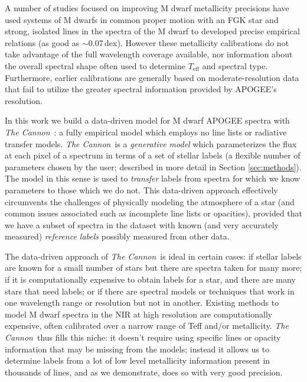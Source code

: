 \documentclass[twocolumn]{aastex62}
\newcommand{\thecannon}{\textsl{The Cannon}}
\newcommand{\teff}{T_{\mathrm{eff}}}
\begin{document}
A number of studies focused on improving M dwarf metallicity precisions have used systems of M dwarfs in common proper motion with an FGK star and strong, isolated lines in the spectra of the M dwarf \citep[e.g.][]{Terrien:2012,RojasAyala:2010,Newton:2014,Neves:2014,Lindgren:2016} to developed precise empirical relations (as good as $\sim$0.07\,dex). 
However these metallicity calibrations do not take advantage of the full wavelength coverage available, nor information about the overall spectral shape often used to determine $\teff$ and spectral type. Furthermore, earlier calibrations are generally based on moderate-resolution data \citep[with some exceptions,][]{Neves:2014, Lindgren:2016} that fail to utilize the greater spectral information provided by APOGEE's resolution.

In this work we build a data-driven model for M dwarf APOGEE spectra with \thecannon\ \citep{Ness:2015,Casey:2016,Ho:2017a,Behmard2019}: a fully empirical model which employs no line lists or radiative transfer models. 
\thecannon\ is a \emph{generative model} which parameterizes the flux at each pixel of a spectrum in terms of a set of stellar labels (a flexible number of parameters chosen by the user; described in more detail in Section \ref{sec:methods}). The model in this sense is used to \emph{transfer} labels from spectra for which we know parameters to those which we do not. This data-driven approach effectively circumvents the challenges of physically modeling the atmosphere of a star (and common issues associated such as incomplete line lists or opacities), provided that we have a subset of spectra in the dataset with known (and very accurately measured) \emph{reference labels} possibly measured from other data. 

The data-driven approach of \thecannon\ is ideal in certain cases:
if stellar labels are known for a small number of stars
but there are spectra taken for many more;
if it is computationally expensive to obtain labels for a star, and
there are many stars that need labels;
or if there are spectral models or techniques that work in one wavelength range or resolution but not in another.
Existing methods to model M dwarf spectra in the NIR at high resolution are computationally expensive, often calibrated over a narrow range of Teff and/or metallicity. \thecannon\ thus fills this niche: it doesn't require using specific lines or opacity information that may be missing from the models; instead it allows us to determine labels from a lot of low level metallicity information present in thousands of lines, and as we demonstrate, does so with very good precision.
\end{document}
